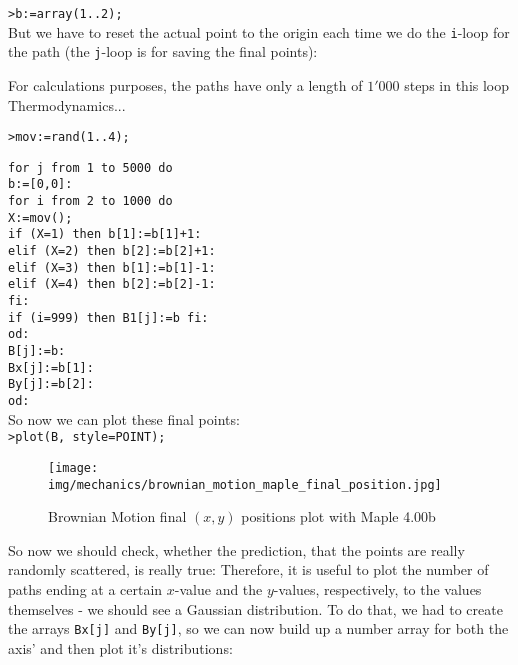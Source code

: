 \begin{tcolorbox}[colframe=black,colback=white,sharp corners]
 	\texttt{>b:=array(1..2);}\\
 	
 	But we have to reset the actual point to the origin each time we do the \texttt{i}-loop for the path (the  \texttt{j}-loop is for saving the final points):

	\begin{tcolorbox}[title=Remark,colframe=black,arc=10pt]
	For calculations purposes, the paths have only a length of $1'000$ steps in this loop Thermodynamics...
	\end{tcolorbox}
	\texttt{>mov:=rand(1..4);}\\
	\end{tcolorbox}
	
	\begin{tcolorbox}[colframe=black,colback=white,sharp corners]
	 \texttt{for j from 1 to 5000 do\\
    b:=[0,0]:\\
    for i from 2 to 1000 do\\
       X:=mov();\\
       if (X=1) then b[1]:=b[1]+1:\\
          elif (X=2) then b[2]:=b[2]+1:\\
          elif (X=3) then b[1]:=b[1]-1:\\
          elif (X=4) then b[2]:=b[2]-1:\\
       fi:\\
       if (i=999) then B1[j]:=b fi:\\
       od:\\
       B[j]:=b:\\
       Bx[j]:=b[1]:\\
       By[j]:=b[2]:\\
	 od:}\\
	 
	 So now we can plot these final points:\\
	 
	 \texttt{>plot(B, style=POINT);}
	 \begin{figure}[H]
		\centering
		\texttt{[image: img/mechanics/brownian\_motion\_maple\_final\_position.jpg]}
		\caption[]{Brownian Motion final $(x,y)$ positions plot with Maple 4.00b}
	\end{figure}
	So now we should check, whether the prediction, that the points are really randomly scattered, is really true: Therefore, it is useful to plot the number of paths ending at a certain $x$-value and the $y$-values, respectively, to the values themselves - we should see a Gaussian distribution. To do that, we had to create the arrays \texttt{Bx[j]} and \texttt{By[j]}, so we can now build up a number array for both the axis' and then plot it's distributions:
	\end{tcolorbox}
	
